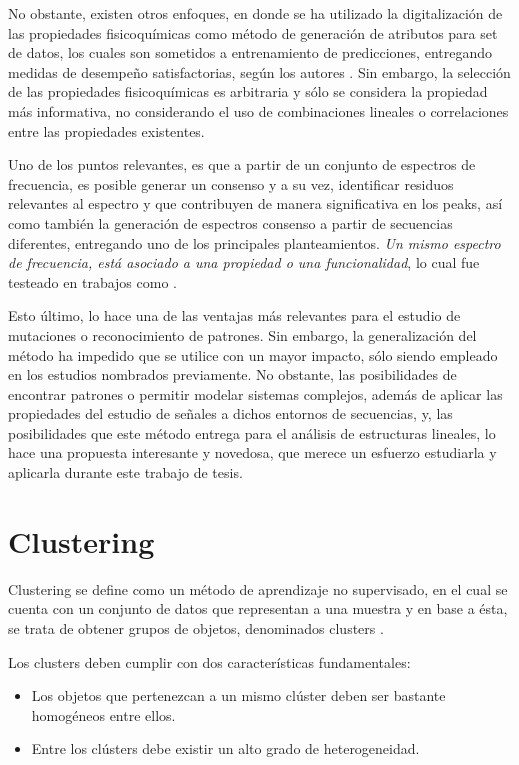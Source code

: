 No obstante, existen otros enfoques, en donde se ha utilizado la digitalización de las propiedades fisicoquímicas como método de generación de atributos para set de datos, los cuales son sometidos a entrenamiento de predicciones, entregando medidas de desempeño satisfactorias, según los autores \cite{cadet2018application}. Sin embargo, la selección de las propiedades fisicoquímicas es arbitraria y sólo se considera la propiedad más informativa, no considerando el uso de combinaciones lineales o correlaciones entre las propiedades existentes.

Uno de los puntos relevantes, es que a partir de un conjunto de espectros de frecuencia, es posible generar un consenso y a su vez, identificar residuos relevantes al espectro y que contribuyen de manera significativa en los peaks, así como también la generación de espectros consenso a partir de secuencias diferentes, entregando uno de los principales planteamientos. \textit{Un mismo espectro de frecuencia, está asociado a una propiedad o una funcionalidad}, lo cual fue testeado en trabajos como \cite{veljkovic1985possible}. 

Esto último, lo hace una de las ventajas más relevantes para el estudio de mutaciones o reconocimiento de patrones. Sin embargo, la generalización del método ha impedido que se utilice con un mayor impacto, sólo siendo empleado en los estudios nombrados previamente. No obstante, las posibilidades de encontrar patrones o permitir modelar sistemas complejos, además de aplicar las propiedades del estudio de señales a dichos entornos de secuencias, y, las posibilidades que este método entrega para el análisis de estructuras lineales, lo hace una propuesta interesante y novedosa, que merece un esfuerzo estudiarla y aplicarla durante este trabajo de tesis.

\section{Clustering}

Clustering se define como un método de aprendizaje no supervisado, en el cual se cuenta con un conjunto de datos que representan a una muestra y en base a ésta, se trata de obtener grupos de objetos, denominados clusters \cite{jain1999data}.

Los clusters deben cumplir con dos características fundamentales:

\begin{itemize}
	\item Los objetos que pertenezcan a un mismo clúster deben ser bastante homogéneos entre ellos.
	\item Entre los clústers debe existir un alto grado de heterogeneidad.
\end{itemize}

